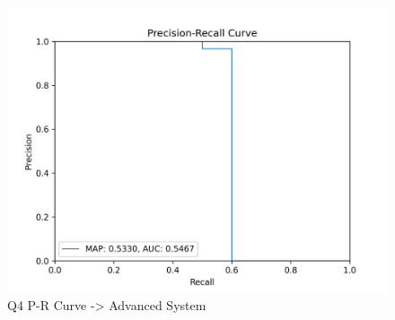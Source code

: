 \documentclass[sigconf]{acmart}
\begin{document}
\begin{figure}[H]
  \centering
  \includegraphics[width=0.8\linewidth]{precision_recall_q4a.png}
  \caption{Q4 P-R Curve -> Advanced System}
  \label{fig:precisionRecallAdvanced4}
\end{figure}

\end{document}

